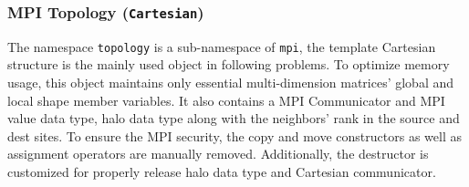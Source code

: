 \subsubsection{MPI Topology (\texttt{Cartesian})}
The namespace \texttt{topology} is a sub-namespace of \texttt{mpi}, 
the template Cartesian structure is the mainly used object in following 
problems.
To optimize memory usage, this object maintains only essential multi-dimension matrices' global and local shape member variables.
It also contains a MPI Communicator and MPI value data type, halo data type along with the neighbors' rank in the source and dest sites.
To ensure the MPI security, the copy and move constructors as well as assignment operators are manually removed.
Additionally, the destructor is customized for properly release halo data type and Cartesian communicator. 


